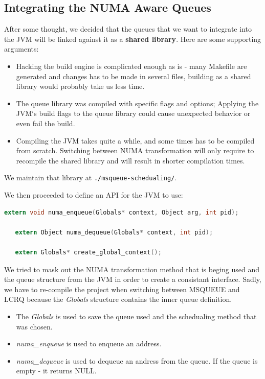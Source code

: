 \documentclass{article}
\begin{document}
 \newpage

 \subsection{Integrating the NUMA Aware Queues} \label{queues:integration}
 After some thought, we decided that the queues that we want to integrate into the JVM will be linked against it as a \textbf{shared library}. Here are some supporting arguments:
 \begin{itemize}
   \item Hacking the build engine is complicated enough as is - many Makefile are generated and changes has to be made in several files, building as a shared library would probably take us less time.
   \item The queue library was compiled with specific flags and options; Applying the JVM`s build flags to the queue library could cause unexpected behavior or even fail the build.
   \item Compiling the JVM takes quite a while, and some times has to be compiled from scratch. Switching between NUMA transformation will only require to recompile the shared library and will result in shorter compilation times.
 \end{itemize}

 We maintain that library at \texttt{./msqueue-schedualing/}. 

 We then proceeded to define an API for the JVM to use:
 \begin{lstlisting}[language=C]
   extern void numa_enqueue(Globals* context, Object arg, int pid);

   extern Object numa_dequeue(Globals* context, int pid);
   
   extern Globals* create_global_context();
 \end{lstlisting}

 We tried to mask out the NUMA transformation method that is beging used and the queue structure from the JVM in order to create a consistant interface. Sadly, we have to re-compile the project when switching between MSQUEUE and LCRQ because the \textit{Globals} structure contains the inner queue definition.

 \begin{itemize}
   \item The \textit{Globals} is used to save the queue used and the schedualing method that was chosen.
   \item \textit{numa\_enqueue} is used to enqueue an address.
   \item \textit{numa\_dequeue} is used to dequeue an andress from the queue. If the queue is empty - it returns NULL.
 \end{itemize}
\end{document}
